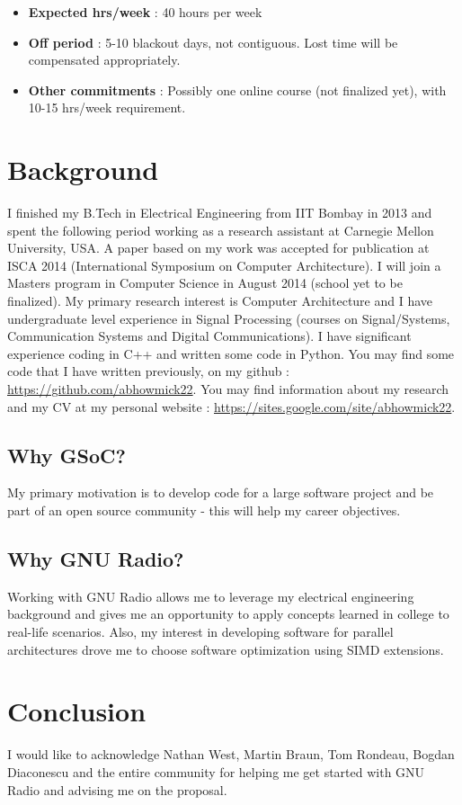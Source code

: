 \documentclass[a4paper,12pt,oneside]{article}
\begin{document}
\begin{itemize}
\item \textbf{Expected hrs/week} : 40 hours per week
\item \textbf{Off period} : 5-10 blackout days, not contiguous. Lost time will be compensated appropriately.
\item \textbf{Other commitments} : Possibly one online course (not finalized yet), with 10-15 hrs/week requirement.
\end{itemize}

\section{Background}
I finished my B.Tech in Electrical Engineering from IIT Bombay in 2013 and spent the following period working as a research assistant at Carnegie Mellon University, USA. A paper based on my work was accepted for publication at ISCA 2014 (International Symposium on Computer Architecture). I will join a Masters program in Computer Science in August 2014 (school yet to be finalized). My primary research interest is Computer Architecture and I have undergraduate level experience in Signal Processing (courses on Signal/Systems, Communication Systems and Digital Communications). I have significant experience coding in C++ and written some code in Python. You may find some code that I have written previously, on my github : \url{https://github.com/abhowmick22}. You may find information about my research and my CV at my personal website : \url{https://sites.google.com/site/abhowmick22}.  

\subsection{Why GSoC?}

My primary motivation is to develop code for a large software project and be part of an open source community - this will help my career objectives.

\subsection{Why GNU Radio?}

Working with GNU Radio allows me to leverage my electrical engineering background and gives me an opportunity to apply concepts learned in college to real-life scenarios. Also, my interest in developing software for parallel architectures drove me to choose software optimization using SIMD extensions. 

\section{Conclusion}
I would like to acknowledge Nathan West, Martin Braun, Tom Rondeau, Bogdan Diaconescu and the entire community for helping me get started with GNU Radio and advising me on the proposal. 

\newpage

\end{document}
